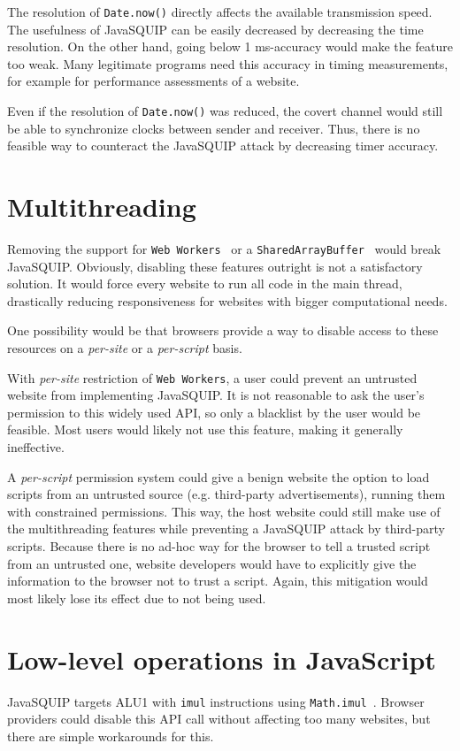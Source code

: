 \documentclass[11pt,
  titlepage=false,
  parskip=half,      %
]{scrreprt}
\begin{document}
The resolution of \texttt{Date.now()} directly affects the available transmission speed.
The usefulness of JavaSQUIP can be easily decreased by decreasing the time resolution.
On the other hand, going below 1 ms-accuracy would make the feature too weak.
Many legitimate programs need this accuracy in timing measurements,
for example for performance assessments of a website.

Even if the resolution of \texttt{Date.now()} was reduced,
the covert channel would still be able to synchronize clocks between sender and receiver.
Thus, there is no feasible way to counteract the JavaSQUIP attack by decreasing timer accuracy.

\section{Multithreading}
Removing the support for \texttt{Web Workers}~\cite{webworkers} or a \texttt{SharedArrayBuffer}~\cite{sharedarraybuffer}
would break JavaSQUIP.
Obviously, disabling these features outright is not a satisfactory solution.
It would force every website to run all code in the main thread,
drastically reducing responsiveness for websites with bigger computational needs.

One possibility would be that browsers provide a way to disable access to these resources on a \textit{per-site} or a \textit{per-script} basis.

With \textit{per-site} restriction of \texttt{Web Workers}, a user could prevent an untrusted website from implementing JavaSQUIP.
It is not reasonable to ask the user's permission to this widely used API,
so only a blacklist by the user would be feasible.
Most users would likely not use this feature, making it generally ineffective.

A \textit{per-script} permission system could give a benign website the option to load scripts from an untrusted source (e.g. third-party advertisements),
running them with constrained permissions.
This way, the host website could still make use of the multithreading features while preventing a JavaSQUIP attack by third-party scripts.
Because there is no ad-hoc way for the browser to tell a trusted script from an untrusted one,
website developers would have to explicitly give the information to the browser not to trust a script.
Again, this mitigation would most likely lose its effect due to not being used.

\section{Low-level operations in JavaScript}
JavaSQUIP targets ALU1 with \texttt{imul} instructions using \texttt{Math.imul}~\cite{mathimul}.
Browser providers could disable this API call without affecting too many websites,
but there are simple workarounds for this.
\end{document}
